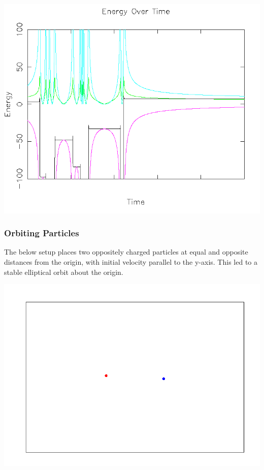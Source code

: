 \documentclass{article}
\begin{document}
\begin{center}
    \includegraphics[scale=0.5]{charged_2_opp_energy_no_collision_tenth_time}
\end{center}

\subsubsection{Orbiting Particles}
The below setup places two oppositely charged particles at equal and opposite distances from the origin, with initial velocity parallel to the y-axis.
This led to a stable elliptical orbit about the origin.
\\
\begin{center}
    \includegraphics[scale=0.5]{orbit}
\end{center}
\end{document}
